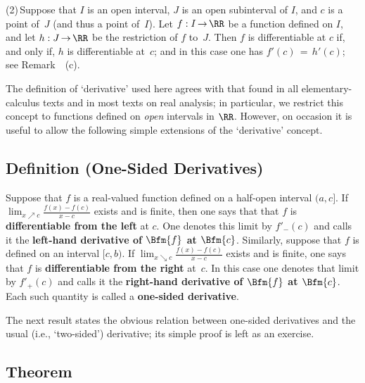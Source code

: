 \V

        (2)\,Suppose that $I$ is an open interval, $J$ is an open subinterval of $I$, and $c$ is a point of~$J$ (and thus a point of~$I$).
    Let $f:I \,{\rightarrow}\, {\RR}$ be a function defined on $I$, and let $h:J \,{\rightarrow}\, {\RR}$ be the restriction of $f$ to~$J$.
    Then $f$ is differentiable at $c$ if, and only if, $h$ is differentiable at~$c$; and in this case one has $f'(c) \,=\, h'(c)$; see Remark~~(c).

\VV

            The definition of `derivative' used here agrees with that found in all elementary-calculus texts and in most texts on real analysis;
    in particular, we restrict this concept to functions defined on {\em open} intervals in ${\RR}$.
    However, on occasion it is useful to allow the following simple extensions of the `derivative' concept.


            \subsection{\small{\bf Definition} (One-Sided Derivatives)}            
            \label{DefE20.25}

\V

\hspace*{\parindent} Suppose that $f$ is a real-valued function defined on a half-open interval $(a,c]$.
    If $\lim_{x{\nearrow}c} {\displaystyle \frac{f(x)-f(c)}{x-c}}$ exists and is finite, then one says that that $f$ is {\bf differentiable from the left} at $c$.
    One denotes this limit by $f'_{-}(c)$ and calls it the {\bf left-hand derivative of $\Bfm{f}$ at $\Bfm{c}$}. Similarly, suppose that $f$ is defined on an interval $[c,b)$.
    If ${\displaystyle \lim_{x{\searrow}c} {\displaystyle \frac{f(x)-f(c)}{x-c}}}$ exists and is finite,
    one says that $f$ is {\bf differentiable from the right} at~$c$. In this case one denotes that limit by
    $f'_{+}(c)$ and calls it the {\bf right-hand derivative of $\Bfm{f}$ at $\Bfm{c}$}. Each such quantity is called a {\bf one-sided derivative}.

\VV

        The next result states the obvious relation between one-sided derivatives
    and the usual (i.e., `two-sided') derivative; its simple proof is left as an exercise.

\V

            \subsection{\small{\bf Theorem}}
            \label{ThmE20.25A}
\V

